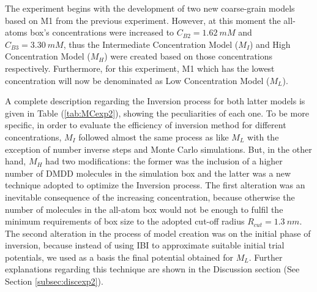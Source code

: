 \documentclass[10pt,a4paper,twoside]{article}
\begin{document}
 The experiment begins with the development of two new coarse-grain models based on M1 from the previous experiment. However, at this moment the all-atoms box's concentrations were increased to $C_{B2} = 1.62\ mM$ and $C_{B3} = 3.30\ mM$, thus the Intermediate Concentration Model ($M_{I}$) and High Concentration Model ($M_{H}$) were created based on those concentrations respectively. Furthermore, for this experiment, M1 which has the lowest concentration will now be denominated as Low Concentration Model ($M_{L}$).
 
  A complete description regarding the Inversion process for both latter models is given in Table (\ref{tab:MCexp2}), showing the peculiarities of each one. To be more specific, in order to evaluate the efficiency of inversion method for different concentrations, $M_{I}$ followed almost the same process as like $M_{L}$ with the exception of number inverse steps and Monte Carlo simulations. But, in the other hand, $M_{H}$ had two modifications: the former was the inclusion of a higher number of DMDD molecules in the simulation box and the latter was a new technique adopted to optimize the Inversion process. The first alteration was an inevitable consequence of the increasing  concentration, because otherwise the number of molecules in the all-atom box would not be enough to fulfil the minimum requirements of box size to the adopted cut-off radius $R_{cut} = 1.3 \ nm$. The second alteration in the process of model creation was on the initial phase of inversion, because instead of using IBI to approximate suitable initial trial potentials, we used as a basis the final potential obtained for $M_{L}$. Further explanations regarding this technique are shown in  the Discussion section (See Section \ref{subsec:discexp2}).
\end{document}
